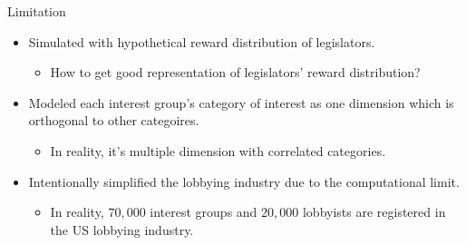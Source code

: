 \documentclass{beamer}
\begin{document}
	\begin{frame}{Limitation}	
		\begin{itemize}
			\item Simulated with hypothetical reward distribution of legislators. 
			\begin{itemize}
				\item How to get good representation of legislators' reward distribution?
			\end{itemize}
			\item Modeled each interest group's category of interest as one dimension which is orthogonal to other categoires.
			\begin{itemize}
				\item In reality, it's multiple dimension with correlated categories.
			\end{itemize}
			\item Intentionally simplified the lobbying industry due to the computational limit.
			\begin{itemize}
				\item In reality, $70,000$ interest groups and $20,000$ lobbyists 
				are registered in the US lobbying industry.  
			\end{itemize}

		\end{itemize}
	\end{frame}




\end{document}
